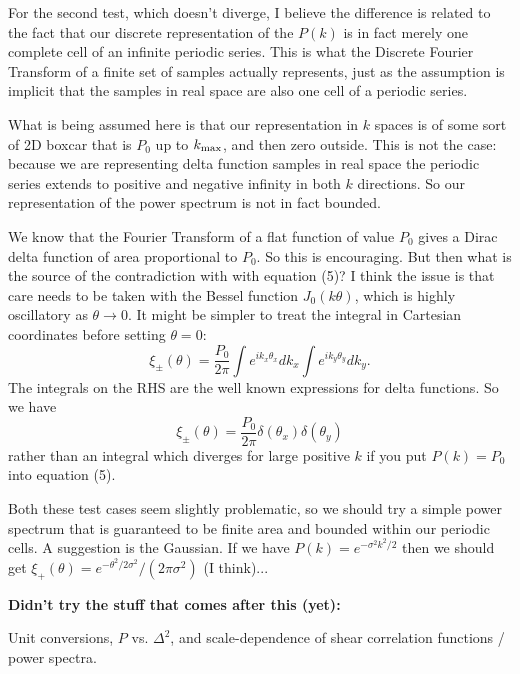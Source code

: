 \documentclass[preprint]{aastex}
\begin{document}
For the second test, which doesn't diverge, 
I believe the difference is related to the fact that our discrete
representation of the $P(k)$ is in fact merely one complete cell of an infinite
periodic series. This is what the Discrete Fourier Transform of a
finite set of samples actually represents, just as the assumption is
implicit that the samples in real space are also one cell of a
periodic series.

What is being assumed here is that our representation in $k$ spaces is
of some sort of 2D boxcar that is $P_0$ up to $k_{\rm max}$, and then
zero outside.  This is not the case: because we are representing delta
function samples in real space the periodic series extends to positive
and negative infinity in both $k$ directions.  So our representation
of the power spectrum is not in fact bounded.

We know that the Fourier Transform of a flat function of value $P_0$ gives a Dirac delta
function of area proportional to $P_0$.  So this is encouraging.  But
then what is the source of the contradiction with with equation (5)?  I think the issue is that
care needs to be taken with the Bessel function $J_0(k \theta)$, which
is highly oscillatory as $\theta \rightarrow 0$.  It might be simpler
to treat the integral in Cartesian coordinates before setting $\theta=0$:
\begin{equation}
\xi_{\pm}(\theta) = \frac{P_0}{2 \pi} \int \! e^{ik_x \theta_x} dk_x
\int \! e^{i k_y \theta_y} dk_y.
\end{equation}
The integrals on the RHS are the well known expressions for delta
functions.  So we have
\begin{equation}
\xi_{\pm}(\theta) = \frac{P_0}{2 \pi} \delta(\theta_x) \delta(\theta_y)
\end{equation}
rather than an integral which diverges for large positive $k$ if you
put $P(k) = P_0$ into equation (5).

Both these test cases seem slightly problematic, so we should try a simple
power spectrum that is guaranteed to be finite area and bounded within
our periodic cells.  A suggestion is the Gaussian.  If we have $P(k) =
e^{-\sigma^2 k^2 / 2}$ then we should get $\xi_+(\theta) =
e^{-\theta^2/2\sigma^2}/(2 \pi \sigma^2)$ (I think)...


\textbf{Didn't try the stuff that comes after this (yet):}

Unit conversions, $P$ vs. $\Delta^2$, and scale-dependence of shear
correlation functions / power spectra.
\end{document}

